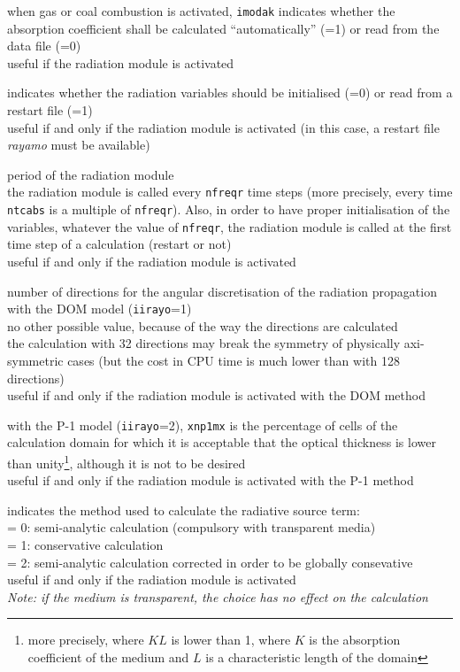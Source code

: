 {when gas or coal combustion is activated, {\tt imodak} indicates whether the
absorption coefficient shall be calculated ``automatically'' (=1) or read from
the data file (=0)\\
useful if the radiation module is activated}

{indicates whether the radiation variables should be initialised (=0) or read
from a restart file (=1)\\
useful if and only if the radiation module is activated (in this case, a
restart file {\em rayamo} must be available)}

{period of the radiation module\\
the radiation module is called every {\tt nfreqr} time steps (more precisely,
every time {\tt ntcabs} is a multiple of {\tt nfreqr}). Also, in order to
have proper initialisation of the variables, whatever the value of {\tt nfreqr},
the radiation module is called at the first time step of a calculation
(restart or not)\\
useful if and only if the radiation module is activated}

{number of directions for the angular discretisation of the radiation
propagation with the DOM model ({\tt iirayo}=1)\\
no other possible value, because of the way the directions are calculated\\
the calculation with 32 directions may break the symmetry of
physically axi-symmetric cases (but the cost in CPU time is much lower
 than with 128 directions)\\
useful if and only if the radiation module is activated with the DOM method}

{with the P-1 model ({\tt iirayo}=2), {\tt xnp1mx} is the percentage of cells of
the calculation domain for which it is acceptable that the optical
thickness is lower than unity\footnote{more precisely, where $KL$ is lower than
1, where $K$ is the absorption coefficient of the medium and $L$ is a
characteristic length of the domain}, although it is not to be desired\\
useful if and only if the radiation module is activated with the P-1 method}

{indicates the method used to calculate the radiative source term:\\
\hspace*{1.3cm}= 0: semi-analytic calculation (compulsory with transparent
media)\\
\hspace*{1.3cm}= 1: conservative calculation\\
\hspace*{1.3cm}= 2: semi-analytic calculation corrected in order to be
globally consevative\\
useful if and only if the radiation module is activated\\
{\em Note: if the medium is transparent, the choice has no effect on the calculation}}

